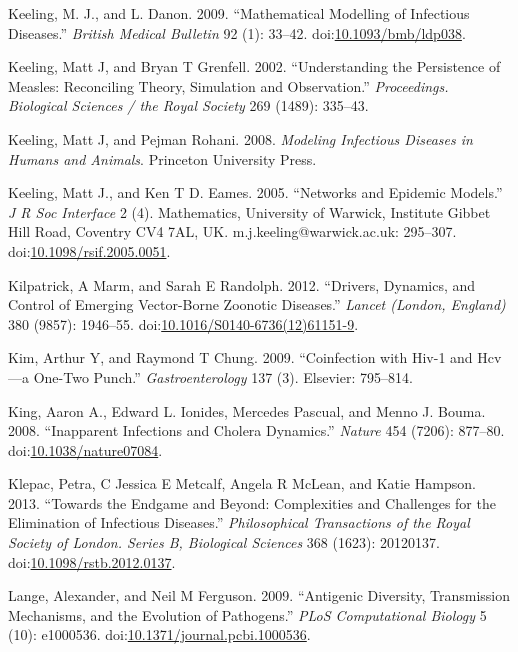 \documentclass[]{book}
\theoremstyle{definition}
\theoremstyle{definition}
\theoremstyle{definition}
\theoremstyle{remark}
\begin{document}
\hypertarget{ref-keeling09}{}
Keeling, M. J., and L. Danon. 2009. ``Mathematical Modelling of
Infectious Diseases.'' \emph{British Medical Bulletin} 92 (1): 33--42.
doi:\href{https://doi.org/10.1093/bmb/ldp038}{10.1093/bmb/ldp038}.

\hypertarget{ref-keeling02}{}
Keeling, Matt J, and Bryan T Grenfell. 2002. ``Understanding the
Persistence of Measles: Reconciling Theory, Simulation and
Observation.'' \emph{Proceedings. Biological Sciences / the Royal
Society} 269 (1489): 335--43.

\hypertarget{ref-keeling08}{}
Keeling, Matt J, and Pejman Rohani. 2008. \emph{Modeling Infectious
Diseases in Humans and Animals}. Princeton University Press.

\hypertarget{ref-keeling05}{}
Keeling, Matt J., and Ken T D. Eames. 2005. ``Networks and Epidemic
Models.'' \emph{J R Soc Interface} 2 (4). Mathematics, University of
Warwick, Institute Gibbet Hill Road, Coventry CV4 7AL, UK.
m.j.keeling@warwick.ac.uk: 295--307.
doi:\href{https://doi.org/10.1098/rsif.2005.0051}{10.1098/rsif.2005.0051}.

\hypertarget{ref-kilpatrick12}{}
Kilpatrick, A Marm, and Sarah E Randolph. 2012. ``Drivers, Dynamics, and
Control of Emerging Vector-Borne Zoonotic Diseases.'' \emph{Lancet
(London, England)} 380 (9857): 1946--55.
doi:\href{https://doi.org/10.1016/S0140-6736(12)61151-9}{10.1016/S0140-6736(12)61151-9}.

\hypertarget{ref-kim09}{}
Kim, Arthur Y, and Raymond T Chung. 2009. ``Coinfection with Hiv-1 and
Hcv---a One-Two Punch.'' \emph{Gastroenterology} 137 (3). Elsevier:
795--814.

\hypertarget{ref-king08}{}
King, Aaron A., Edward L. Ionides, Mercedes Pascual, and Menno J. Bouma.
2008. ``Inapparent Infections and Cholera Dynamics.'' \emph{Nature} 454
(7206): 877--80.
doi:\href{https://doi.org/10.1038/nature07084}{10.1038/nature07084}.

\hypertarget{ref-klepac13}{}
Klepac, Petra, C Jessica E Metcalf, Angela R McLean, and Katie Hampson.
2013. ``Towards the Endgame and Beyond: Complexities and Challenges for
the Elimination of Infectious Diseases.'' \emph{Philosophical
Transactions of the Royal Society of London. Series B, Biological
Sciences} 368 (1623): 20120137.
doi:\href{https://doi.org/10.1098/rstb.2012.0137}{10.1098/rstb.2012.0137}.

\hypertarget{ref-lange09}{}
Lange, Alexander, and Neil M Ferguson. 2009. ``Antigenic Diversity,
Transmission Mechanisms, and the Evolution of Pathogens.'' \emph{PLoS
Computational Biology} 5 (10): e1000536.
doi:\href{https://doi.org/10.1371/journal.pcbi.1000536}{10.1371/journal.pcbi.1000536}.
\end{document}

